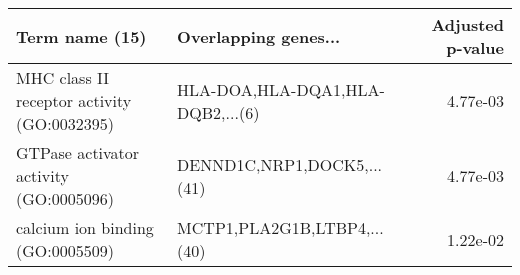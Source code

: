 \begin{tabular}{llr}
\toprule
                             Term name (15) &             Overlapping genes... &  Adjusted p-value \\
\midrule
MHC class II receptor activity (GO:0032395) & HLA-DOA,HLA-DQA1,HLA-DQB2,...(6) &          4.77e-03 \\
     GTPase activator activity (GO:0005096) &       DENND1C,NRP1,DOCK5,...(41) &          4.77e-03 \\
           calcium ion binding (GO:0005509) &      MCTP1,PLA2G1B,LTBP4,...(40) &          1.22e-02 \\
\bottomrule
\end{tabular}
